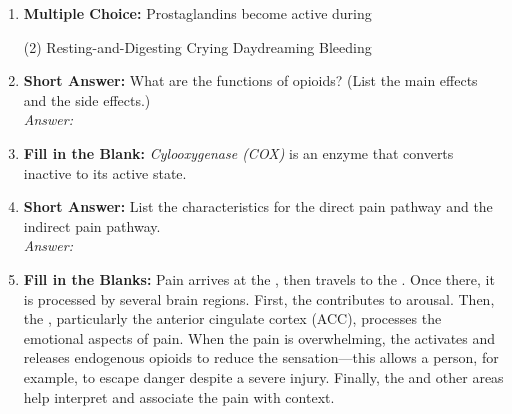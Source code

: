 \begin{enumerate}[label=\textbf{Q3.2.\arabic*}]
    \item \textbf{Multiple Choice:} Prostaglandins become active during
        \begin{tasks}[label=\textcolor{\documentTheme}{(\Alph*)}, item-format=\color{\documentTheme}, label-width=1.5em, item-indent=1.7em](2)
            \task Resting-and-Digesting
            \task Crying
            \task Daydreaming 
            \task Bleeding
        \end{tasks}

    \item \textbf{Short Answer:} What are the functions of opioids? (List the main effects and the side effects.) \\
        \textit{Answer:} %

    \item \textbf{Fill in the Blank:} \textit{Cylooxygenase (COX)} is an enzyme that converts inactive \underline{\hspace{3cm}} to its active state.

    \item \textbf{Short Answer:} List the characteristics for the direct pain pathway and the indirect pain pathway. \\
        \textit{Answer:} %

    \item \textbf{Fill in the Blanks:} Pain arrives at the \underline{\hspace{4cm}}, then travels to the \underline{\hspace{3cm}}. Once there, it is processed by several brain regions. First, the \underline{\hspace{3cm}} contributes to arousal. Then, the \underline{\hspace{3cm}}, particularly the anterior cingulate cortex (ACC), processes the emotional aspects of pain. When the pain is overwhelming, the \underline{\hspace{3cm}} activates and releases endogenous opioids to reduce the sensation—this allows a person, for example, to escape danger despite a severe injury. Finally, the \underline{\hspace{3cm}} and other areas help interpret and associate the pain with context. 


\end{enumerate}
